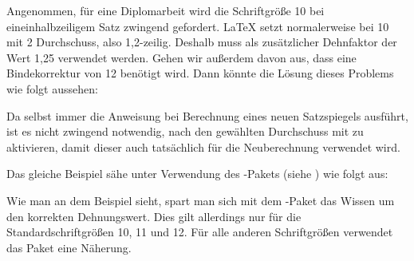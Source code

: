 \begin{Example}
  Angenommen, für eine Diplomarbeit wird die Schriftgröße
  10 bei eineinhalbzeiligem Satz zwingend gefordert. {\LaTeX}
  setzt normalerweise bei 10 mit 2 Durchschuss,
  also 1,2-zeilig. Deshalb muss als zusätzlicher Dehnfaktor der Wert
  1,25 verwendet werden. Gehen wir außerdem davon aus, dass eine
  Bindekorrektur von 12 benötigt wird. Dann könnte die Lösung
  dieses Problems wie folgt aussehen:
  Da  selbst immer die Anweisung  bei
  Berechnung eines neuen Satzspiegels ausführt, ist es nicht zwingend
  notwendig, nach  den gewählten Durchschuss mit
   zu aktivieren, damit dieser %
\iftrue %
  auch tatsächlich 
\fi %
  für die Neuberechnung verwendet wird.

  Das gleiche Beispiel sähe unter Verwendung des
  -Pakets%
  (siehe \cite{package:setspace}) wie folgt aus:
\end{Example}

Wie man an dem Beispiel sieht, spart man sich mit dem
-Paket das Wissen um den korrekten Dehnungswert. Dies gilt
allerdings nur für die Standardschriftgrößen 10, 11 und
12. Für alle anderen Schriftgrößen verwendet das Paket 
%
\iffalse %
einen näherungsweise passenden Dehnungswert.
%
\else %
eine Näherung.
\fi

